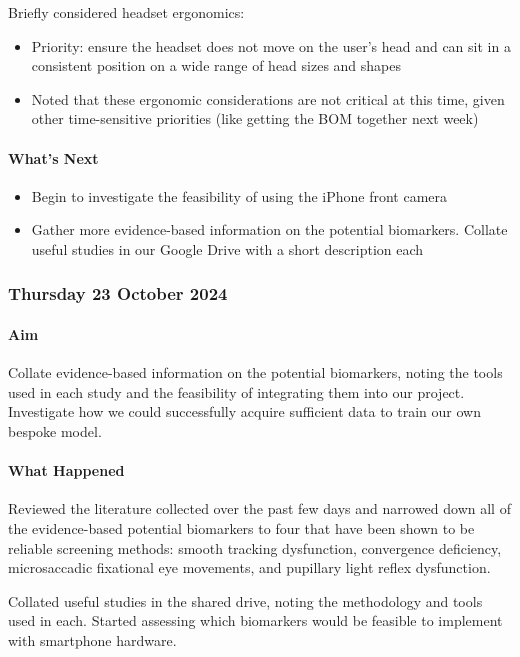 Briefly considered headset ergonomics:
\begin{itemize}
    \item Priority: ensure the headset does not move on the user's head and can sit in a consistent position on a wide range of head sizes and shapes
    \item Noted that these ergonomic considerations are not critical at this time, given other time-sensitive priorities (like getting the BOM together next week)
\end{itemize}

\paragraph{What's Next}
\begin{itemize}
    \item Begin to investigate the feasibility of using the iPhone front camera
    \item Gather more evidence-based information on the potential biomarkers. Collate useful studies in our Google Drive with a short description each
\end{itemize}

\subsubsection*{Thursday 23 October 2024}

\paragraph{Aim}
Collate evidence-based information on the potential biomarkers, noting the tools used in each study and the feasibility of integrating them into our project. Investigate how we could successfully acquire sufficient data to train our own bespoke model.

\paragraph{What Happened}
Reviewed the literature collected over the past few days and narrowed down all of the evidence-based potential biomarkers to four that have been shown to be reliable screening methods: smooth tracking dysfunction, convergence deficiency, microsaccadic fixational eye movements, and pupillary light reflex dysfunction.

Collated useful studies in the shared drive, noting the methodology and tools used in each. Started assessing which biomarkers would be feasible to implement with smartphone hardware.

